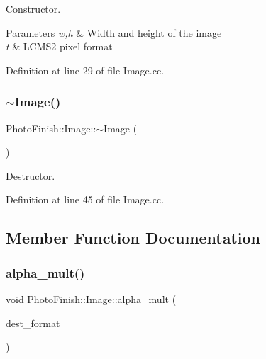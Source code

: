 Constructor. 


\begin{DoxyParams}{Parameters}
{\em w,h} & Width and height of the image \\
\hline
{\em t} & L\+C\+M\+S2 pixel format \\
\hline
\end{DoxyParams}


Definition at line 29 of file Image.\+cc.

\mbox{\label{class_photo_finish_1_1_image_a6c300a891d479ece70ffa849b39397fd}} 
\subsubsection{\texorpdfstring{$\sim$\+Image()}{~Image()}}
{\footnotesize\ttfamily Photo\+Finish\+::\+Image\+::$\sim$\+Image (\begin{DoxyParamCaption}{ }\end{DoxyParamCaption})}



Destructor. 



Definition at line 45 of file Image.\+cc.



\subsection{Member Function Documentation}
\mbox{\label{class_photo_finish_1_1_image_a4e491dfdc87676fac9f10b0ae15503ec}} 
\subsubsection{\texorpdfstring{alpha\+\_\+mult()}{alpha\_mult()}}
{\footnotesize\ttfamily void Photo\+Finish\+::\+Image\+::alpha\+\_\+mult (\begin{DoxyParamCaption}\item[{\hyperlink{class_c_m_s_1_1_format}{C\+M\+S\+::\+Format}}]{dest\+\_\+format }\end{DoxyParamCaption})}



